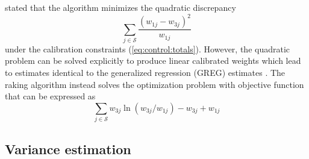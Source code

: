 \citet{deming:stephan:1940} stated that the algorithm minimizes the quadratic
discrepancy
$$
    \sum_{j \in \mathcal{S}} \frac{ (w_{1j}-w_{3j})^2}{w_{1j}}
$$
under the calibration constraints (\ref{eq:control:totals}).
However, the quadratic problem can be solved explicitly to
produce linear calibrated weights which lead to estimates
identical to the generalized regression (GREG) estimates
\citep[Case 1]{deville:sarndal:1992}. The raking algorithm instead solves
the optimization problem with objective function that can be expressed as
\citep[Case 2]{deville:sarndal:1992}
\begin{equation}
    \sum_{j \in \mathcal{S}} w_{3j} \ln( w_{3j}/w_{1j}) - w_{3j} + w_{1j}
    \label{eq:raking:discrepancy}
\end{equation}

\subsection{Variance estimation}
\label{subsec:variance}


